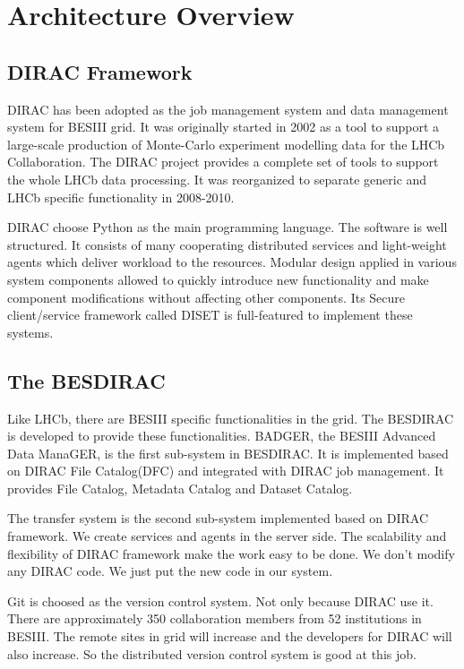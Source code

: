 \section{Architecture Overview}

\subsection{DIRAC Framework}

DIRAC has been adopted as the job management system and data management
system for BESIII grid. It was originally started in 2002 as a tool
to support a large-scale production of Monte-Carlo experiment modelling
data for the LHCb Collaboration. The DIRAC project provides a 
complete set of tools to support the whole LHCb data processing.
It was reorganized to separate generic and LHCb specific functionality
in 2008-2010.

DIRAC choose Python as the main programming language.
The software is well structured. 
It consists of many cooperating distributed services and light-weight
agents which deliver workload to the resources.
Modular design applied in various system components allowed to quickly
introduce new functionality and make component modifications without
affecting other components.
Its Secure client/service framework called DISET is full-featured
to implement these systems.

\subsection{The BESDIRAC}

Like LHCb, there are BESIII specific functionalities in the grid.
The BESDIRAC is developed to provide these functionalities.
BADGER, the BESIII Advanced Data ManaGER, is the first sub-system
in BESDIRAC. It is implemented based on DIRAC File Catalog(DFC)
and integrated with DIRAC job management.
It provides File Catalog, Metadata Catalog and Dataset Catalog.

The transfer system is the second sub-system implemented based on
DIRAC framework. We create services and agents in the server side.
The scalability and flexibility of DIRAC framework make the work
easy to be done. We don't modify any DIRAC code. We just put the 
new code in our system.

Git is choosed as the version control system.
Not only because DIRAC use it. There are approximately 350
collaboration members from 52 institutions in BESIII.
The remote sites in grid will increase and the developers for DIRAC
will also increase. So the distributed version control system 
is good at this job.

